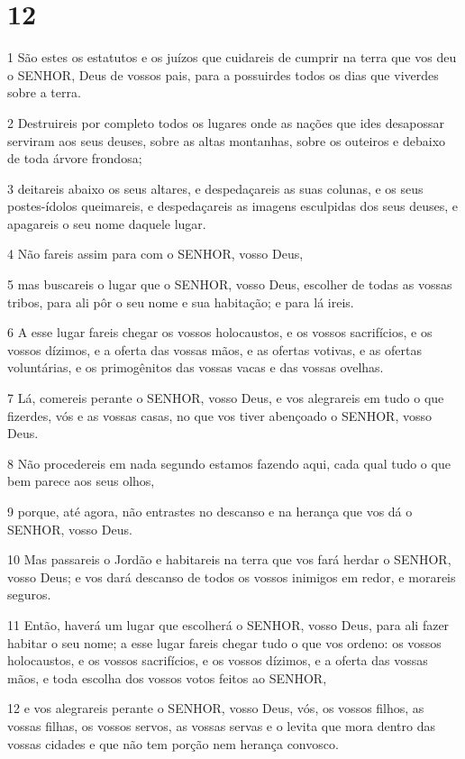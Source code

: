 \chapter{12}

\par 1 São estes os estatutos e os juízos que cuidareis de cumprir na terra que vos deu o SENHOR, Deus de vossos pais, para a possuirdes todos os dias que viverdes sobre a terra.
\par 2 Destruireis por completo todos os lugares onde as nações que ides desapossar serviram aos seus deuses, sobre as altas montanhas, sobre os outeiros e debaixo de toda árvore frondosa;
\par 3 deitareis abaixo os seus altares, e despedaçareis as suas colunas, e os seus postes-ídolos queimareis, e despedaçareis as imagens esculpidas dos seus deuses, e apagareis o seu nome daquele lugar.
\par 4 Não fareis assim para com o SENHOR, vosso Deus,
\par 5 mas buscareis o lugar que o SENHOR, vosso Deus, escolher de todas as vossas tribos, para ali pôr o seu nome e sua habitação; e para lá ireis.
\par 6 A esse lugar fareis chegar os vossos holocaustos, e os vossos sacrifícios, e os vossos dízimos, e a oferta das vossas mãos, e as ofertas votivas, e as ofertas voluntárias, e os primogênitos das vossas vacas e das vossas ovelhas.
\par 7 Lá, comereis perante o SENHOR, vosso Deus, e vos alegrareis em tudo o que fizerdes, vós e as vossas casas, no que vos tiver abençoado o SENHOR, vosso Deus.
\par 8 Não procedereis em nada segundo estamos fazendo aqui, cada qual tudo o que bem parece aos seus olhos,
\par 9 porque, até agora, não entrastes no descanso e na herança que vos dá o SENHOR, vosso Deus.
\par 10 Mas passareis o Jordão e habitareis na terra que vos fará herdar o SENHOR, vosso Deus; e vos dará descanso de todos os vossos inimigos em redor, e morareis seguros.
\par 11 Então, haverá um lugar que escolherá o SENHOR, vosso Deus, para ali fazer habitar o seu nome; a esse lugar fareis chegar tudo o que vos ordeno: os vossos holocaustos, e os vossos sacrifícios, e os vossos dízimos, e a oferta das vossas mãos, e toda escolha dos vossos votos feitos ao SENHOR,
\par 12 e vos alegrareis perante o SENHOR, vosso Deus, vós, os vossos filhos, as vossas filhas, os vossos servos, as vossas servas e o levita que mora dentro das vossas cidades e que não tem porção nem herança convosco.
